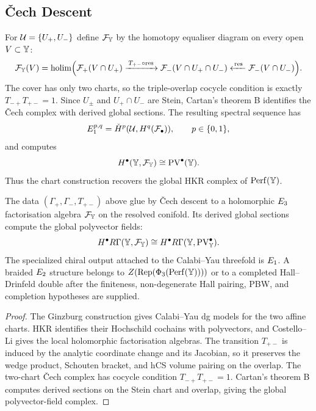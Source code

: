 \subsection*{\v{C}ech Descent}

For $\mathcal{U}=\{U_+,U_-\}$ define $\mathcal{F}_{\mathbb{Y}}$ by the homotopy equaliser
diagram on every open $V\subset\mathbb{Y}$:
\[
  \mathcal{F}_{\mathbb{Y}}(V)=
  \mathrm{holim}\Bigl(
  \mathcal{F}_+(V\cap U_+)
  \xrightarrow{\,T_{+-}\circ\mathrm{res}\,}
  \mathcal{F}_-(V\cap U_+\cap U_-)
  \xleftarrow{\,\mathrm{res}\,}
  \mathcal{F}_-(V\cap U_-)
  \Bigr).
\]
The cover has only two charts, so the triple-overlap cocycle condition
is exactly $T_{-+}T_{+-}=1$. Since $U_\pm$ and $U_+\cap U_-$ are Stein,
Cartan's theorem B identifies the \v{C}ech complex with derived global
sections. The resulting spectral sequence has
\[
  E_1^{p,q}=\check H^p(\mathcal{U},H^q(\mathcal{F}_\bullet)),
  \qquad p\in\{0,1\},
\]
and computes
\[
  H^\bullet(\mathbb{Y},\mathcal{F}_{\mathbb{Y}})\cong\mathrm{PV}^\bullet(\mathbb{Y}).
\]
Thus the chart construction recovers the global HKR complex of
\(\mathrm{Perf}(\mathbb{Y})\).

\begin{theorem}
\label{thm:conifold-E3-gluing}
The data $(\Gamma_+,\Gamma_-,T_{+-})$ above glue by \v{C}ech descent
to a holomorphic $E_3$ factorisation algebra $\mathcal{F}_{\mathbb{Y}}$ on the
resolved conifold. Its derived global sections compute the global
polyvector fields:
\[
  H^\bullet R\Gamma(\mathbb{Y},\mathcal{F}_{\mathbb{Y}})\cong H^\bullet R\Gamma(\mathbb{Y},\mathrm{PV}^\bullet_{\mathbb{Y}}).
\]
The specialized chiral output attached to the Calabi--Yau threefold is
$E_1$. A braided $E_2$ structure belongs to
$Z(\mathrm{Rep}(\Phi_3(\mathrm{Perf}(\mathbb{Y}))))$ or to a completed
Hall--Drinfeld double after the finiteness, non-degenerate Hall pairing,
PBW, and completion hypotheses are supplied.
\end{theorem}

\begin{proof}
The Ginzburg construction gives Calabi--Yau dg models for the two
affine charts. HKR identifies their Hochschild cochains with
polyvectors, and Costello--Li gives the local holomorphic
factorisation algebras. The transition $T_{+-}$ is induced by the
analytic coordinate change and its Jacobian, so it preserves the wedge
product, Schouten bracket, and hCS volume pairing on the overlap. The
two-chart \v{C}ech complex has cocycle condition $T_{-+}T_{+-}=1$.
Cartan's theorem B computes derived sections on the Stein chart and
overlap, giving the global polyvector-field complex.
\end{proof}

